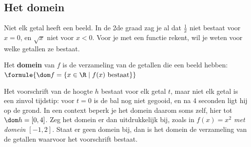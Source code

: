 \subsection{Het domein}

Niet elk getal heeft een beeld. In de 2de graad zag je al dat $\frac1x$ niet bestaat voor $x = 0$, en $\sqrt{x}$ niet voor $x < 0$. Voor je met een functie rekent, wil je weten voor welke getallen ze bestaat.

\begin{theorie}
Het \textbf{\textcolor{accent}{domein}} van $f$ is de verzameling van de getallen die een beeld hebben: \quad $\formule{\dom f = \{x \in \R \mid f(x) \text{ bestaat}\}}$
\end{theorie}

Het voorschrift van de hoogte $h$ bestaat voor elk getal $t$, maar niet elk getal is een zinvol tijdstip: voor $t = 0$ is de bal nog niet gegooid, en na 4 seconden ligt hij op de grond. In een context beperk je het domein daarom soms zelf, hier tot $\dom h = [0, 4]$. Zeg het domein er dan uitdrukkelijk bij, zoals in \textit{$f(x) = x^2$ met domein $[-1, 2]$}. Staat er geen domein bij, dan is het domein de verzameling van de getallen waarvoor het voorschrift bestaat.

